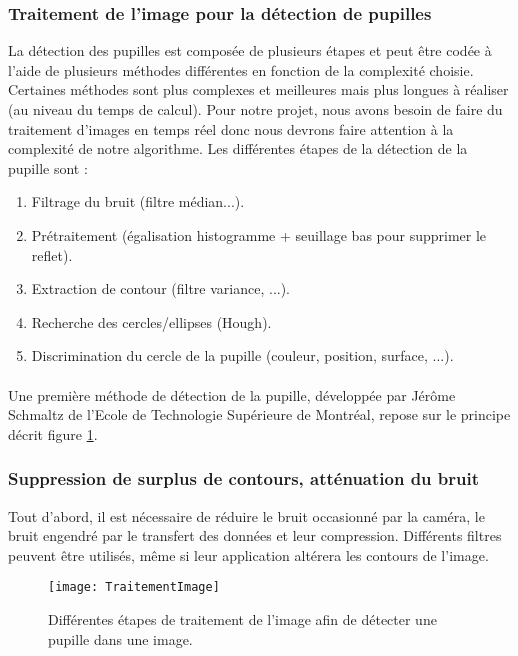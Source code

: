 \subsubsection{Traitement de l’image pour la détection de pupilles}

La détection des pupilles est composée de plusieurs étapes et peut être codée à l’aide de plusieurs méthodes différentes en fonction de la complexité choisie. Certaines méthodes sont plus complexes et meilleures mais plus longues à réaliser (au niveau du temps de calcul). Pour notre projet, nous avons besoin de faire du traitement d’images en temps réel donc nous devrons faire attention à la complexité de notre algorithme. Les différentes étapes de la détection de la pupille sont : 
\begin{enumerate}
\item Filtrage du bruit (filtre médian...).
\item Prétraitement (égalisation histogramme + seuillage bas pour supprimer le reflet).
\item Extraction de contour (filtre variance, ...).
\item Recherche des cercles/ellipses (Hough).
\item Discrimination du cercle de la pupille (couleur, position, surface, ...).
\end{enumerate}
\paragraph{}
Une première méthode de détection de la pupille, développée par Jérôme Schmaltz de l’Ecole de Technologie Supérieure de Montréal, repose sur le principe décrit figure \ref{fig:TraitementImage}.


\subsubsection*{Suppression de surplus de contours, atténuation du bruit}
\label{Filtre}

Tout d’abord, il est nécessaire de réduire le bruit occasionné par la caméra, le bruit engendré par le transfert des données et leur compression. Différents filtres \cite{bergounioux2010quelques} peuvent être utilisés, même si leur application altérera les contours de l’image. 

\begin{figure}[H]
  \centering
  \texttt{[image: TraitementImage]}
  \caption{Différentes étapes de traitement de l’image afin de détecter une pupille dans une image.}
  \label{fig:TraitementImage}
\end{figure}

